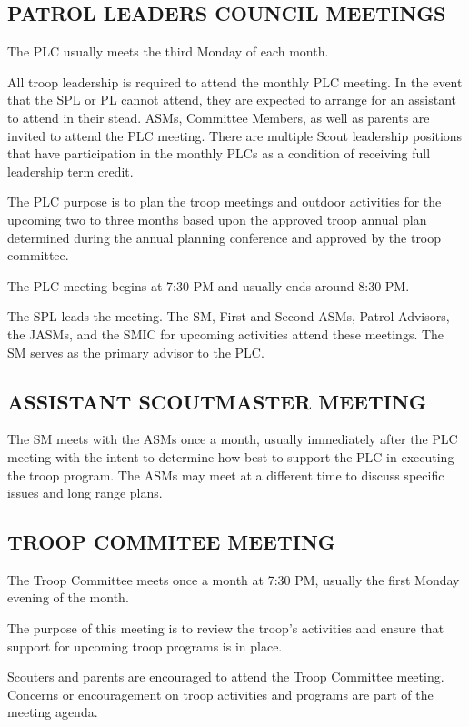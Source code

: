 \documentclass{ltxguide}
\begin{document}
\subsection{PATROL LEADERS COUNCIL MEETINGS}
The \ac{PLC} usually meets the third Monday of each month. 

All troop leadership is required to attend the monthly \ac{PLC} meeting. In the event that the \ac{SPL} or \ac{PL} cannot attend, they are expected to arrange for an assistant to attend in their stead. \acp{ASM}, Committee  Members, as well as parents are invited to attend the \ac{PLC} meeting. There are multiple Scout leadership positions that have participation in the monthly \acp{PLC} as a condition of receiving full leadership term credit.

The \ac{PLC} purpose is to plan the troop meetings and outdoor activities for the upcoming two to three months based upon the approved troop annual plan determined during the annual planning conference and approved by the troop committee.

The \ac{PLC} meeting begins at 7:30 PM and usually ends around 8:30 PM.

The \ac{SPL} leads the meeting. The \ac{SM}, First and Second \acp{ASM}, Patrol Advisors, the \acp{JASM}, and the \ac{SMIC} for upcoming activities attend these meetings. The \ac{SM} serves as the primary advisor to the \ac{PLC}.

\subsection{ASSISTANT SCOUTMASTER MEETING}
The \ac{SM} meets with the \acp{ASM} once a month, usually immediately after the \ac{PLC} meeting with the intent to determine how best to support the \ac{PLC} in executing the troop program. The \acp{ASM} may meet at a different time to discuss specific issues and long range plans.

\subsection{TROOP COMMITEE MEETING}
The Troop Committee meets once a month at 7:30 PM, usually the first Monday evening of the month.

The purpose of this meeting is to review the troop's activities and ensure that support for upcoming troop programs is in place.

Scouters and parents are encouraged to attend the Troop Committee meeting. Concerns or encouragement on troop activities and programs are part of the meeting agenda.
\end{document}
